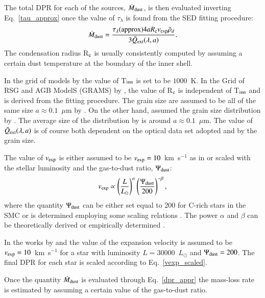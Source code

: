 \documentclass[useAMS,usenatbib]{mn2e/mn2e}
\begin{document}
The total DPR for each of the sources, $\dot{M}_{\rm dust}$, is then evaluated inverting Eq.~\ref{tau_approx} once the value of $\tau_\lambda$ is found from the SED fitting procedure:
\begin{equation}\label{dpr_appr}
\dot{M}_{\rm dust}=\frac{\tau_\lambda{\rm (approx)}4 a R_{\rm c} v_{\rm exp} \bar{\rho}_d}{3\bar{Q}_{\rm ext}(\lambda, a)}.
\end{equation}
The condensation radius R$_{\rm c}$ is usually consistently computed by assuming a certain dust temperature at the boundary of the inner shell. 

In the grid of models by \citet{Groenewegen07} the value of T$_{\rm inn}$ is set to be $1000$~K. 
In the Grid of RSG and AGB ModelS (GRAMS) by \citet{Srinivasan11},
the value of R$_{\rm c}$ is independent of T$_{\rm inn}$ and is derived from the fitting procedure.
The grain size are assumed to be all of the same size $a\approx 0.1$~$\mu$m by \citet{Groenewegen07}.
On the other hand, \citet{Srinivasan16} assumed the grain size distribution by \citet{Kim94}.
The average size of the distribution by \citet{Srinivasan16} is around $a\approx 0.1$~$\mu$m. The value of $\bar{Q}_{\rm ext}(\lambda, a)$ is of course both dependent on the optical data set adopted and by the grain size.

The value of $v_{\rm exp}$ is either assumed to be $v_{\rm exp}=10$~km~s$^{-1}$ as in \citet{Groenewegen09} or scaled with the stellar luminosity and the gas-to-dust ratio, $\Psi_{\rm dust}$:
\begin{equation}\label{vexp_scaled}
v_{\rm exp}\propto \left(\frac{L}{L_\odot}\right)^{\alpha} \left(\frac{\Psi_{\rm dust}}{200}\right)^{-\beta},
\end{equation}
%
where the quantity $\Psi_{\rm dust}$ can be either set equal to 200 for C-rich stars in the SMC \citep{Groenewegen06, Groenewegen07, Groenewegen09, Gullieuszik12, Boyer12, Srinivasan16} or is determined employing some scaling relations \citep{Bressan98, Marigo08}. The power $\alpha$ and $\beta$ can be theoretically derived \citep{Habing94} or empirically determined \citep{vanLoon06_2, Goldman17}.

In the works by \citet{Boyer12} and \citet{Srinivasan16} the value of the expansion velocity is assumed to be $v_{\rm exp}=10$~km~s$^{−1}$ for a star with luminosity $L= 30000$~$L_\odot$ and $\Psi_{\rm dust}=200$. The final DPR for each star is scaled according to Eq.~\ref{vexp_scaled}. 

Once the quantity $\dot{M}_{\rm dust}$ is evaluated through Eq.~\ref{dpr_appr} the mass-loss rate is estimated by assuming a certain value of the gas-to-dust ratio.
\end{document}
